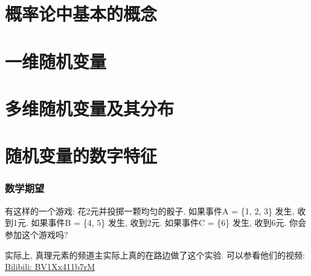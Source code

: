 
\usepackage{ctex}
\usepackage{pifont}
\usepackage{cleveref}





\part{概率论中基本的概念}

\begin{shaded}
    
\end{shaded}

\begin{shaded}
    
\end{shaded}


\begin{shaded}
    
\end{shaded}

\part{一维随机变量}





\part{多维随机变量及其分布}





\part{随机变量的数字特征}

\section{数学期望}

有这样的一个游戏: 花2元并投掷一颗均匀的骰子. 如果事件A = \{1, 2, 3\} 发生, 收到1元. 如果事件B = \{4, 5\} 发生, 收到2元. 如果事件C = \{6\} 发生, 收到6元. 你会参加这个游戏吗?

\begin{webaside}
    实际上, 真理元素的频道主实际上真的在路边做了这个实验. 可以参看他们的视频: \href{https://www.bilibili.com/video/BV1Xx411b7rM}{Bilibili: BV1Xx411b7rM}
\end{webaside}

